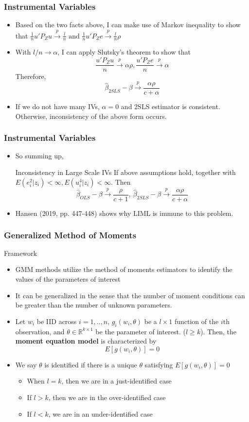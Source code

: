\documentclass{beamer}
\begin{document}
\begin{frame}
\frametitle{Instrumental Variables}
\begin{itemize}
\item Based on the two facts above, I can make use of Markov inequality to show that $\frac{1}{n}u'P_Zu\xrightarrow{p} \frac{l}{n}\text{ and }\frac{1}{n}u'P_Ze\xrightarrow{p}\frac{l}{n}\rho$
\item With $l/n\to\alpha$, I can apply Slutsky's theorem to show that 
\[
\frac{u'P_Zu}{n}\xrightarrow{p} \alpha\rho, \frac{u'P_Ze}{n}\xrightarrow{p} \alpha
\]
Therefore, 
\[
\hat{\beta}_{2SLS}-\beta\xrightarrow{p}\frac{\alpha\rho}{c+\alpha}
\]
\item If we do not have many IVs, $\alpha=0$ and 2SLS estimator is consistent. Otherwise, inconsistency of the above form occurs. 
\end{itemize}
\end{frame}

\begin{frame}
\frametitle{Instrumental Variables}
\begin{itemize}
\item So summing up, 
\begin{block}{Inconsistency in Large Scale IVs}
If above assumptions hold, together with $E(e_i^2|z_i)<\infty, E(u_i^4|z_i)<\infty$. Then 
\[
\hat{\beta}_{OLS}-\beta\xrightarrow{p}\frac{\rho}{c+1},\   \hat{\beta}_{2SLS}-\beta\xrightarrow{p}\frac{\alpha\rho}{c+\alpha}
\]
\end{block}
\item Hansen (2019, pp. 447-448) shows why LIML is immune to this problem. 
\end{itemize}
\end{frame}

\begin{frame}
\frametitle{Generalized Method of Moments}
Framework 
\begin{itemize}
\item GMM methods utilize the method of moments estimators to identify the values of the parameters of interest
\item  It can be generalized in the sense that the number of moment conditions can be greater than the number of unknown parameters.
\item Let $w_i$ be IID across $i=1,..,n$,  $g_i(w_i, \theta)$ be a $l\times1$ function of the $i$th observation, and $\theta\in\mathbb{R}^{k\times1}$ be the parameter of interest.  ($l\geq k$). Then, the \textbf{moment equation model} is characterized by
\[
E[g(w_i,\theta)]=0
\]
\item  We say $\theta$ is identified if there is a unique $\theta$ satisfying $E[g(w_i,\theta)]=0$
\begin{itemize}
\item When $l=k$, then we are in a just-identified case
\item If $l>k$, then we are in the over-identified case %
\item If  $l<k$, we are in an under-identified case
\end{itemize}
\end{itemize}
\end{frame}
\end{document}
